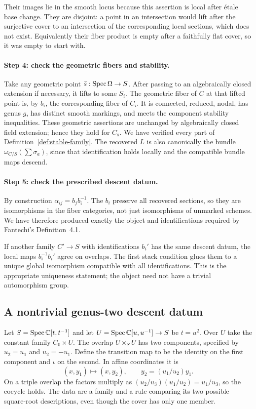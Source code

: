 Their images lie in the smooth locus because this assertion is
local after \'etale base change. They are disjoint: a point in
an intersection would lift after the surjective cover to an
intersection of the corresponding local sections, which does
not exist. Equivalently their fiber product is empty after a
faithfully flat cover, so it was empty to start with.

\paragraph{Step 4: check the geometric fibers and stability.}
Take any geometric point $\bar s:\operatorname{Spec}\Omega\to S$. After
passing to an algebraically closed extension if necessary, it
lifts to some $S_i$. The geometric fiber of $C$ at that lifted
point is, by $b_i$, the corresponding fiber of $C_i$. It is
connected, reduced, nodal, has genus $g$, has distinct smooth
markings, and meets the component stability inequalities.
These geometric assertions are unchanged by algebraically
closed field extension; hence they hold for $C_{\bar s}$.
We have verified every part of Definition~\ref{def:stable-family}.
The recovered $L$ is also canonically the bundle
$\omega_{C/S}(\sum\sigma_a)$, since that identification holds
locally and the compatible bundle maps descend.

\paragraph{Step 5: check the prescribed descent datum.}
By construction $\alpha_{ij}=b_jb_i^{-1}$. The $b_i$ preserve
all recovered sections, so they are isomorphisms in the fiber
categories, not just isomorphisms of unmarked schemes. We have
therefore produced exactly the object and identifications
required by Fantechi's Definition~4.1.

If another family $C'\to S$ with identifications $b_i'$ has
the same descent datum, the local maps $b_i^{-1}b_i'$ agree
on overlaps. The first stack condition glues them to a unique
global isomorphism compatible with all identifications. This
is the appropriate uniqueness statement; the object need not
have a trivial automorphism group.

\subsection{A nontrivial genus-two descent datum}\label{sec:genus-two-twist}

Let $S=\operatorname{Spec}\mathbb C[t,t^{-1}]$ and let
$U=\operatorname{Spec}\mathbb C[u,u^{-1}]\to S$ be $t=u^2$. Over $U$ take
the constant family $C_0\times U$. The overlap $U\times_SU$
has two components, specified by $u_2=u_1$ and $u_2=-u_1$.
Define the transition map to be the identity on the first
component and $\iota$ on the second. In affine coordinates it is
\[
                  (x,y_1)\longmapsto(x,y_2),
                   \qquad y_2=(u_1/u_2)y_1.
\]
On a triple overlap the factors multiply as
$(u_2/u_3)(u_1/u_2)=u_1/u_3$, so the cocycle holds.
The data are a family and a rule comparing its two possible
square-root descriptions, even though the cover has only one
member.

